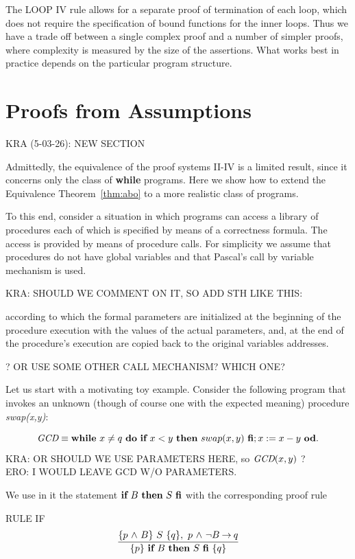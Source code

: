 \documentclass[manuscript, screen, review]{acmart}
\begin{document}
The LOOP IV rule allows for a separate proof of termination of each
loop, which does not require the specification of bound functions for
the inner loops.  Thus we have a trade off between a single complex
proof and a number of simpler proofs, where complexity is measured by
the size of the assertions.  What works best in practice depends on
the particular program structure.




\section{Proofs from Assumptions}
\label{sec:assumptions}

KRA (5-03-26): NEW SECTION
\III

Admittedly, the equivalence of the proof systems II-IV is a limited
result, since it concerns only the class of \textbf{while}
programs. Here we show how to extend the Equivalence
Theorem~\ref{thm:abo} to a more realistic class of programs.

To this end, consider a situation in which programs can access a library of
procedures each of which is specified by means of a correctness
formula. The access is provided by means of procedure calls.  For
simplicity we assume that procedures do not have global variables and
that Pascal's call by variable mechanism is used.

KRA: SHOULD WE COMMENT ON IT, SO ADD STH LIKE THIS: 

\NI
according to which the formal parameters are initialized at the
beginning of the procedure execution with the values of the actual
parameters, and, at the end of the  procedure's execution are
copied back to the original variables addresses.

\NI ? OR USE SOME OTHER CALL MECHANISM? WHICH ONE?

Let us start with a motivating toy example. Consider the following program
that invokes an unknown (though of course one with the expected meaning)
procedure \emph{swap(x,y)}:

\[
\mbox{{\it GCD}} \equiv \mbox{$\mbox{{\bf while}\ } {x \neq q}\ \mbox{{\bf do}\ } {\mbox{$\mbox{{\bf if}\ } {x < y} \mbox{\ {\bf then}\ } {swap(x,y)}\ \mbox{{\bf fi}}$}; x:= x-y}\ \mbox{{\bf od}}$}.
\]
KRA: OR SHOULD WE USE PARAMETERS HERE, so $\mbox{{\it GCD}}(x,y)$ ? \\
ERO: I WOULD LEAVE GCD W/O PARAMETERS.

We use in it the statement $\mbox{$\mbox{{\bf if}\ } {B} \mbox{\ {\bf then}\ } {S}\ \mbox{{\bf fi}}$}$ 
with the corresponding proof rule
\III

\NI
RULE IF
  \[ \frac{ \mbox{$\{{p \mbox{$\ \wedge\ $} B}\}\ {S}\ \{{q}\}$}, \ p \mbox{$\ \wedge\ $} \neg B \mbox{$\:\rightarrow\:$} q}
  { \mbox{$\{{p}\}\ {\mbox{$\mbox{{\bf if}\ } {B} \mbox{\ {\bf then}\ } {S}\ \mbox{{\bf fi}}$}}\ \{{q}\}$}}
  \]
\III
  
\end{document}
